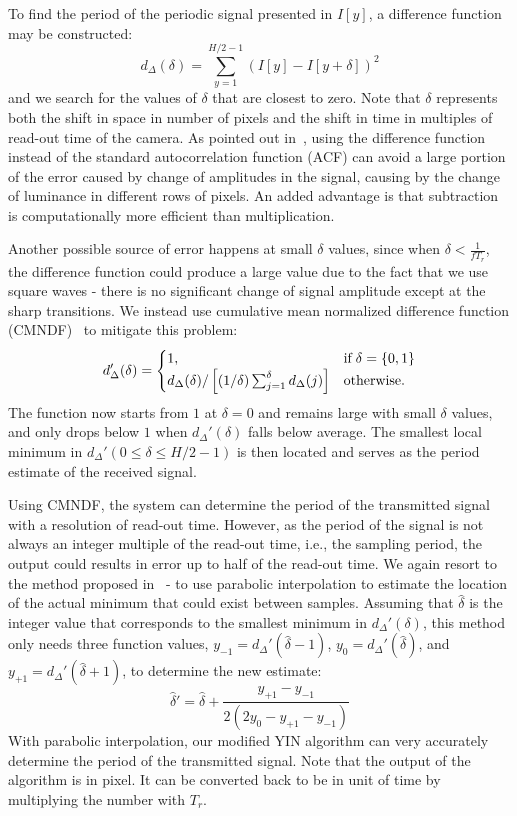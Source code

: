To find the period of the periodic signal presented in $I[y]$, a difference function may be constructed:
\begin{equation}
	d_\Delta(\delta)=\sum^{H/2-1}_{y=1} (I[y] - I[y+\delta])^2
\end{equation}
and we search for the values of $\delta$ that are closest to zero. Note that $\delta$ represents both the shift in space in number of pixels and the shift in time in multiples of read-out time of the camera. As pointed out in~\cite{de2002yin}, using the difference function instead of the standard autocorrelation function (ACF) can avoid a large portion of the error caused by change of amplitudes in the signal, causing by the change of luminance in different rows of pixels. An added advantage is that subtraction is computationally more efficient than multiplication.

Another possible source of error happens at small $\delta$ values, since when $\delta<\frac{1}{f T_r}$, the difference function could produce a large value due to the fact that we use square waves - there is no significant change of signal amplitude except at the sharp transitions. We instead use cumulative mean normalized difference function (CMNDF)~\cite{de2002yin} to mitigate this problem:
\begin{equation}
	d_\Delta'(\delta) =\begin{cases} 1, & \textrm{if\;} \delta=\{0,1\} \\
	d_\Delta(\delta) / \left [ (1/\delta) \sum^\delta_{j=1} d_\Delta(j) \right ] & \textrm{otherwise.} \end{cases}
\end{equation}
The function now starts from $1$ at $\delta=0$ and remains large with small $\delta$ values, and only drops below $1$ when $d_\Delta'(\delta)$ falls below average. The smallest local minimum in $d_\Delta'(0 \leq \delta \leq H/2-1)$ is then located and serves as the period estimate of the received signal.

Using CMNDF, the system can determine the period of the transmitted signal with a resolution of read-out time. However, as the period of the signal is not always an integer multiple of the read-out time, i.e., the sampling period, the output could results in error up to half of the read-out time. We again resort to the method proposed in~\cite{de2002yin} - to use parabolic interpolation to estimate the location of the actual minimum that could exist between samples. Assuming that $\hat{\delta}$ is the integer value that corresponds to the smallest minimum in $d_\Delta'(\delta)$, this method only needs three function values, $y_{-1}=d_\Delta'(\hat{\delta}-1)$, $y_{0}=d_\Delta'(\hat{\delta})$, and $y_{+1}=d_\Delta'(\hat{\delta}+1)$, to determine the new estimate:
\begin{equation}
	\hat{\delta}'=\hat{\delta}+\frac{y_{+1}-y_{-1}}{2 (2 y_0 - y_{+1} - y_{-1})}
\end{equation}
With parabolic interpolation, our modified YIN algorithm can very accurately determine the period of the transmitted signal. Note that the output of the algorithm is in pixel. It can be converted back to be in unit of time by multiplying the number with $T_r$.


